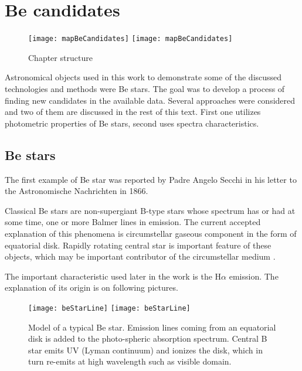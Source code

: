 \chapter{Be candidates}

\begin{figure}[!htbp]
  \begin{center}
    \leavevmode
    \ifpdf
    \texttt{[image: mapBeCandidates]}
    \else
    \texttt{[image: mapBeCandidates]} 
    \fi
    \caption{Chapter structure}
    \label{FigStructure}
  \end{center}
\end{figure}


Astronomical objects used in this work to demonstrate some of the
discussed technologies and methods were Be stars. The goal was to
develop a process of finding new candidates in the available
data. Several approaches were considered and two of them are discussed
in the rest of this text. First one utilizes photometric properties of
Be stars, second uses spectra characteristics.


\section{Be stars}

The first example of Be star was reported by Padre Angelo Secchi in
his letter to the Astronomische Nachrichten in 1866.

Classical Be stars are non-supergiant B-type stars whose spectrum has
or had at some time, one or more Balmer lines in emission. The current
accepted explanation of this phenomena is circumstellar gaseous
component in the form of equatorial disk. Rapidly rotating central
star is important feature of these objects, which may be important
contributor of the circumstellar medium \citep{porter2003classical}.

The important characteristic used later in the work is the H$\alpha$
emission. The explanation of its origin is on following pictures.


    \begin{figure}[!htbp]
      \begin{center}
        \leavevmode
        \ifpdf
        \texttt{[image: beStarLine]}
        \else
        \texttt{[image: beStarLine]}
        \fi
        \caption{Model of a typical Be star. Emission lines coming
          from an equatorial disk is added to the photo-spheric
          absorption spectrum. Central B star emits UV (Lyman
          continuum) and ionizes the disk, which in turn re-emits at
          high wavelength such as visible
          domain. \citep{hirata1984star}}
        \label{Figjhk_be_b}
      \end{center}
    \end{figure}


